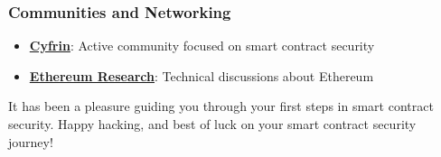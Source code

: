 \documentclass[12pt]{article}
\begin{document}
\subsubsection*{Communities and Networking}

\begin{itemize}
    \item \textbf{\href{https://discord.gg/cyfrin}{Cyfrin}}: Active community focused on smart contract security
    \item \textbf{\href{https://discord.gg/qGpsxSA}{Ethereum Research}}: Technical discussions about Ethereum
\end{itemize}

\noindent
It has been a pleasure guiding you through your first steps in smart contract security. Happy hacking, and best of luck on your smart contract security journey!
\end{document}
